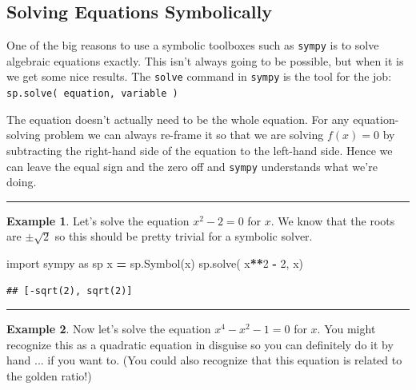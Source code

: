 \documentclass[
]{book}
\newenvironment{Shaded}{\begin{snugshade}}{\end{snugshade}}
\newcommand{\DecValTok}[1]{\textcolor[rgb]{0.00,0.00,0.81}{#1}}
\newcommand{\ImportTok}[1]{#1}
\newcommand{\NormalTok}[1]{#1}
\newcommand{\OperatorTok}[1]{\textcolor[rgb]{0.81,0.36,0.00}{\textbf{#1}}}
\newcommand{\StringTok}[1]{\textcolor[rgb]{0.31,0.60,0.02}{#1}}
\theoremstyle{definition}
\theoremstyle{definition}
\newtheorem{example}{Example}[chapter]
\theoremstyle{definition}
\theoremstyle{remark}
\begin{document}
\hypertarget{solving-equations-symbolically}{%
\subsection{Solving Equations Symbolically}\label{solving-equations-symbolically}}

One of the big reasons to use a symbolic toolboxes such as \texttt{sympy} is to solve algebraic equations exactly. This isn't always going to be possible, but when it is we get some nice results. The \texttt{solve} command in \texttt{sympy} is the tool for the job: \texttt{sp.solve(\ equation,\ variable\ )}

The equation doesn't actually need to be the whole equation. For any equation-solving problem we can always re-frame it so that we are solving \(f(x) = 0\) by subtracting the right-hand side of the equation to the left-hand side. Hence we can leave the equal sign and the zero off and \texttt{sympy} understands what we're doing.

\begin{center}\rule{0.5\linewidth}{0.5pt}\end{center}

\begin{example}
\protect\hypertarget{exm:unnamed-chunk-819}{}{\label{exm:unnamed-chunk-819} }Let's solve the equation \(x^2 - 2 = 0\) for \(x\). We know that the roots are \(\pm \sqrt{2}\) so this should be pretty trivial for a symbolic solver.
\end{example}

\begin{Shaded}
\begin{Highlighting}[]
\ImportTok{import}\NormalTok{ sympy }\ImportTok{as}\NormalTok{ sp}
\NormalTok{x }\OperatorTok{=}\NormalTok{ sp.Symbol(}\StringTok{\textquotesingle{}x\textquotesingle{}}\NormalTok{)}
\NormalTok{sp.solve( x}\OperatorTok{**}\DecValTok{2} \OperatorTok{{-}} \DecValTok{2}\NormalTok{, x)}
\end{Highlighting}
\end{Shaded}

\begin{verbatim}
## [-sqrt(2), sqrt(2)]
\end{verbatim}

\begin{center}\rule{0.5\linewidth}{0.5pt}\end{center}

\begin{example}
\protect\hypertarget{exm:unnamed-chunk-821}{}{\label{exm:unnamed-chunk-821} }Now let's solve the equation \(x^4 - x^2 - 1= 0\) for \(x\). You might recognize this as a quadratic equation in disguise so you can definitely do it by hand ... if you want to. (You could also recognize that this equation is related to the golden ratio!)
\end{example}
\end{document}
